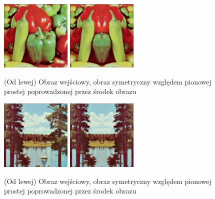 \documentclass[final,a4paper,openany,12pt]{mwbk}
\begin{document}
\begin{figure}[H]
	\begin{center}
		\includegraphics[width=0.3\textwidth]{1/1Geo_px_Original}
		\includegraphics[width=0.3\textwidth]{1/1Geo_px_Result}
	\end{center}
	\caption{(Od lewej) Obraz wejściowy, obraz symetryczny względem pionowej prostej poprowadzonej przez środek obrazu }
\end{figure}

\begin{figure}[H]
	\begin{center}
		\includegraphics[width=0.3\textwidth]{2/2Geo_px_Original}
		\includegraphics[width=0.3\textwidth]{2/2Geo_px_Result}
	\end{center}
	\caption{(Od lewej) Obraz wejściowy, obraz symetryczny względem pionowej prostej poprowadzonej przez środek obrazu }
\end{figure}
\end{document}
